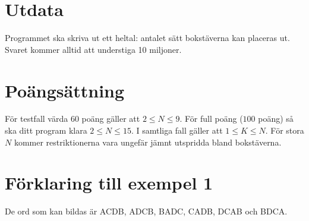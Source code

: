 \section*{Utdata}

Programmet ska skriva ut ett heltal: antalet sätt bokstäverna kan
placeras ut. Svaret kommer alltid att understiga 10 miljoner.

\section*{Poängsättning}

För testfall värda $60$ poäng gäller att $2\le N\le 9$. För full
poäng ($100$ poäng) så ska ditt program klara $2\le N\le 15$. I samtliga fall gäller att $1\le K\le N$.
För stora $N$ kommer restriktionerna vara ungefär jämnt utspridda bland
bokstäverna. 

\section*{Förklaring till exempel 1}

De ord som kan bildas är ACDB, ADCB, BADC, CADB,
DCAB och BDCA.

